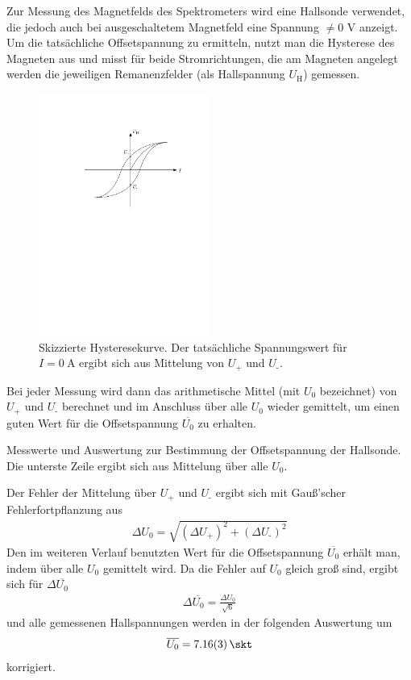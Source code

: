 \documentclass[11pt, a4paper]{article}
\numberwithin{equation}{section}
\begin{document}
Zur Messung des Magnetfelds des Spektrometers wird eine Hallsonde verwendet, die jedoch auch bei ausgeschaltetem Magnetfeld eine Spannung $\neq 0$ \si{\volt} anzeigt.
Um die tatsächliche Offsetspannung zu ermitteln, nutzt man die Hysterese des Magneten aus und misst für beide Stromrichtungen, die am Magneten angelegt werden die jeweiligen Remanenzfelder (als Hallspannung $U_\text{H}$) gemessen.
\begin{figure}[h]
	\centering
	\includegraphics[width=0.5\textwidth]{./figures/hysterese.pdf}
	\caption{Skizzierte Hysteresekurve. Der tatsächliche Spannungswert für $I=\SI{0}{\ampere}$ ergibt sich aus Mittelung von $U_\text{+}$ und $U_\text{-}$.}
	\label{fig:hysterese}
\end{figure}
Bei jeder Messung wird dann das arithmetische Mittel (mit $U_0$ bezeichnet) von $U_\text{+}$ und $U_\text{-}$ berechnet und im Anschluss über alle $U_0$ wieder gemittelt, um einen guten Wert für die Offsetspannung $\overline{U_0}$ zu erhalten.
\begin{table}[h]
	\centering
	
	\caption{Messwerte und Auswertung zur Bestimmung der Offsetspannung der Hallsonde. Die unterste Zeile ergibt sich aus Mittelung über alle $U_0$.}
	\label{tab:offset}
\end{table}
Der Fehler der Mittelung über $U_\text{+}$ und $U_\text{-}$ ergibt sich mit Gauß'scher Fehlerfortpflanzung aus
\begin{align}
	\Delta U_0 = \sqrt{(\Delta U_\text{+})^2 + (\Delta U_\text{-})^2}
\end{align}
Den im weiteren Verlauf benutzten Wert für die Offsetspannung $\overline{U_0}$ erhält man, indem über alle $U_0$ gemittelt wird. Da die Fehler auf $U_0$ gleich groß sind, ergibt sich für $\Delta\overline{U_0}$
\begin{align}
	\Delta\overline{U_0} = \frac{\Delta U_0}{\sqrt{6}}
\end{align}
und alle gemessenen Hallspannungen werden in der folgenden Auswertung um
\begin{align}
	\overline{U_0} = \SI{7.16 +- 0.03}{\skt}
	\label{hall_korrektur}
\end{align}
korrigiert.
\end{document}

